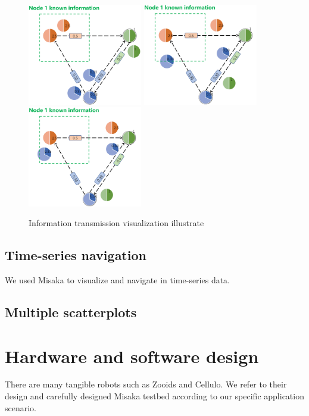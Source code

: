 \documentclass[conference]{IEEEtran}
\begin{document}
\begin{figure}[htbp]
    \centering
    \includegraphics[width=5cm]{PPT1.png}
    \includegraphics[width=5cm]{PPT2.png}
    \includegraphics[width=5cm]{PPT3.png}
    \caption{Information transmission visualization illustrate}
\label{fig:PPT}
\end{figure}

\subsection{Time-series navigation}

We used Misaka to visualize and navigate in time-series data.

\subsection{Multiple scatterplots}


\section{Hardware and software design}

There are many tangible robots such as Zooids\cite{le2016zooids} and Cellulo\cite{ozgur2017cellulo}. We refer to their design and carefully designed Misaka testbed according to our specific application scenario.
\end{document}
